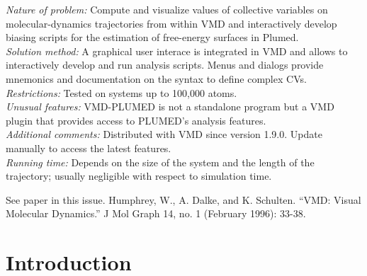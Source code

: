 \documentclass[preprint,12pt]{elsarticle}
\begin{document}
\begin{small}
  {\em Nature of problem:} Compute and visualize values of collective
  variables on molecular-dynamics trajectories from within VMD and
  interactively develop biasing scripts for the estimation of
  free-energy surfaces in Plumed.
  \\
  {\em Solution method:} A graphical user interace is integrated in
  VMD and allows to interactively develop and run analysis scripts.
  Menus and dialogs provide mnemonics and documentation on the syntax
  to define complex CVs.
  \\
  {\em Restrictions:}
  Tested on systems up to 100,000 atoms. \\
  {\em Unusual features:} VMD-PLUMED is not a standalone program but a
  VMD plugin that provides
  access to PLUMED's analysis features. \\
  {\em Additional comments:} Distributed with VMD since version 1.9.0.
  Update manually to access   the latest features.   \\
  {\em Running time:} Depends on the size of the system and the length
  of the trajectory; usually negligible with respect to simulation time.  \\
\begin{thebibliography}{0}
See paper in this issue.
Humphrey, W., A. Dalke, and K. Schulten. ``VMD: Visual Molecular Dynamics.'' J Mol Graph 14, no. 1 (February 1996): 33-38. 
\end{thebibliography}

\end{small}



\section{Introduction}
\end{document}
